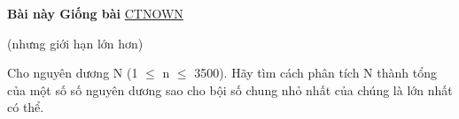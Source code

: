\textbf{Bài này Giống bài }\href{http://vnoi.info/problems/show/CTNOWN/}{CTNOWN}

(nhưng giới hạn lớn hơn)

Cho nguyên dương N (1 $\le$ n $\le$ 3500). Hãy tìm cách phân tích N thành tổng của một số số nguyên dương sao cho bội số chung nhỏ nhất của chúng là lớn nhất có thể.